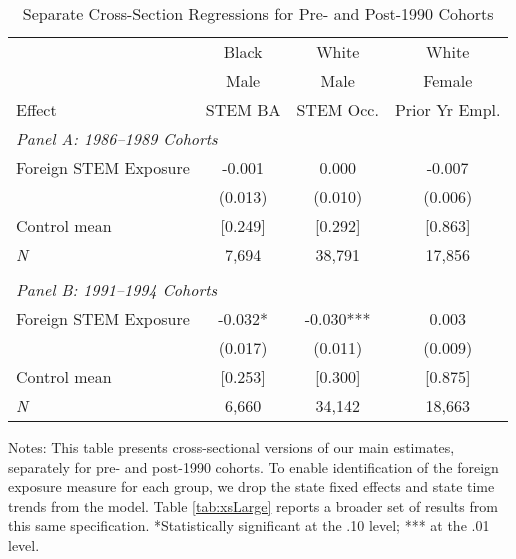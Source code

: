 \begin{table}[ht]
\caption{Separate Cross-Section Regressions for Pre- and Post-1990 Cohorts}
\label{tab:xsSmall}
\centering
\begin{threeparttable}
\begin{tabular}{lccc}
\toprule 
       & Black           & White        & White       \\
       & Male            & Male         & Female      \\
Effect & STEM BA         & STEM Occ.    & Prior Yr Empl.\\
\midrule 
\multicolumn{4}{l}{\emph{Panel A: 1986--1989 Cohorts}}\\ 
Foreign STEM Exposure & -0.001  & 0.000  & -0.007  \\ 
 &  (0.013) & (0.010) & (0.006) \\ 
Control mean &  [0.249]        & [0.292]       & [0.863] \\ 
\emph{N} &      7,694 &    38,791 &    17,856 \\ 
&&&\\
\multicolumn{4}{l}{\emph{Panel B: 1991--1994 Cohorts}}\\ 
Foreign STEM Exposure & -0.032* & -0.030*** & 0.003  \\ 
 &  (0.017) & (0.011) & (0.009) \\ 
Control mean &  [0.253]        & [0.300]       & [0.875] \\ 
\emph{N} &      6,660 &    34,142 &    18,663 \\ 
\bottomrule 
\end{tabular} 
\footnotesize Notes: This table presents cross-sectional versions of our main estimates, separately for pre- and post-1990 cohorts. To enable identification of the foreign exposure measure for each group, we drop the state fixed effects and state time trends from the model. Table \ref{tab:xsLarge} reports a broader set of results from this same specification. *Statistically significant at the .10 level; *** at the .01 level.
\end{threeparttable} 
\end{table} 
